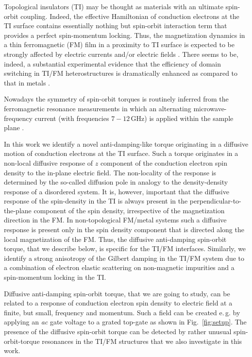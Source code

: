Topological insulators (TI) \cite{fu_topological_2007,moore_topological_2007,roy_topological_2009,hsieh_topological_2008} may be thought as materials with an ultimate spin-orbit coupling. Indeed, the effective Hamiltonian of conduction electrons at the TI surface contains essentially nothing but spin-orbit interaction term that provides a perfect spin-momentum locking. Thus, the magnetization dynamics in a thin ferromagnetic (FM) film in a proximity to TI surface is expected to be strongly affected by electric currents and/or electric fields \cite{qi_fractional_2008}. There seems to be, indeed, a substantial experimental evidence that the efficiency of domain switching in TI/FM heterostructures is dramatically enhanced as compared to that in metals \cite{mellnik_spin-transfer_2014,wang_SOT_BiSe_2014,fan_magnetization_2014,Fan_SOT_TI_2016,Yasuda_SOT_BiSbTe_2017,Cha2018}. 

Nowadays the symmetry of spin-orbit torques is routinely inferred from the ferromagnetic resonance measurements in which an alternating microwave-frequency current (with frequencies $7-12$\,GHz) is applied within the sample plane \cite{mellnik_spin-transfer_2014,Ralph2011SOTFMresonance,Wang2015_SOTHflCoFEBIMgO,Ralph2016SOTWTE2,Ralph2018SOT}. 

In this work we identify a novel anti-damping-like torque originating in a diffusive motion of conduction electrons at the TI surface. Such a torque originates in a non-local diffusive response of $z$ component of the conduction electron spin density to the in-plane electric field. The non-locality of the response is determined by the so-called diffusion pole in analogy to the density-density response of a disordered system. It is, however, important that the diffusive response of the spin-density in the TI is always present in the perpendicular-to-the-plane component of the spin density, irrespective of the magnetization direction in the FM. In non-topological FM/metal systems such a diffusive response is present only in the spin density component that is directed along the local magnetization of the FM. Thus, the diffusive anti-damping spin-orbit torque, that we describe below, is specific for the TI/FM interfaces. Similarly, we identify a strong anisotropy of the Gilbert damping in the TI/FM system due to a combination of electron elastic scattering on non-magnetic impurities and a spin-momentum locking in the TI.  



Diffusive anti-damping spin-orbit torque, that we are going to study, can be related to a response of conduction electron spin density to electric field at a finite, but small, frequency and momentum. Such a field can be created e.\,g. by applying an \textit{ac} gate voltage to a grated top-gate as shown in Fig.~\ref{fig:setup}. The presence of the diffusive spin-orbit torque can be detected by rather unusual spin-orbit-torque resonances in the TI/FM structures that we also investigate in this work. 

